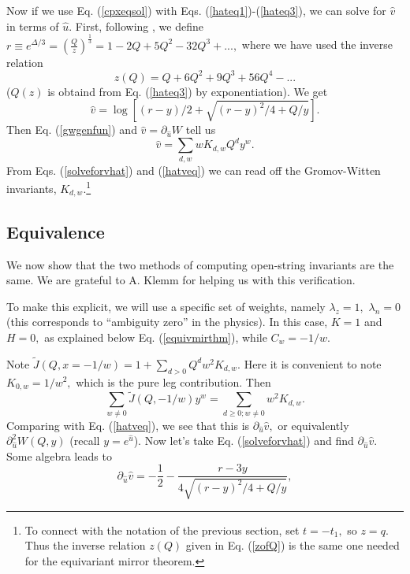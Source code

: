 \documentclass[a4paper,11pt]{article}
\begin{document}
Now if we use Eq. \!(\ref{cpxeqsol}) with
Eqs. (\ref{hateq1})-(\ref{hateq3}), we can
solve for $\hat{v}$ in terms of $\hat{u}.$
First, 
following \cite{AKV},
we define $r \equiv e^{\Delta/3} =
(\frac{Q}{z})^{\frac{1}{3}} = 1 - 2Q + 5Q^2 - 32Q^3 + ...,$
where we have used the inverse relation
\begin{equation}
\label{zofQ}
z(Q) = Q + 6Q^2 + 9Q^3 + 56Q^4 - ...
\end{equation}
($Q(z)$ is obtaind from Eq. \!(\ref{hateq3}) by exponentiation). 
We get
\begin{equation}
\label{solveforvhat}
\hat{v} = \log\left[(r-y)/2 + \sqrt{(r-y)^2/4 + Q/y}\right].
\end{equation}
Then Eq. \!(\ref{gwgenfun})
and $\hat{v} = \partial_{\hat{u}}W$
tell us
\begin{equation}
\label{hatveq}
\hat{v} = \sum_{d,w}w K_{d,w}Q^d y^w.
\end{equation}
From Eqs. (\ref{solveforvhat})
and (\ref{hatveq}) we can read off the Gromov-Witten
invariants, $K_{d,w}.$\footnote{To
connect with the notation of the previous section,
set $t = -t_1,$ so $z = q.$  Thus the inverse relation
$z(Q)$ given in Eq. \!(\ref{zofQ})
is the same one needed for the equivariant mirror theorem.}

\subsection{Equivalence}

We now show that the two methods of computing
open-string invariants are the same.  We are grateful
to A. Klemm for helping us with this verification.

To make this explicit, we will use a specific set
of weights, namely $\lambda_z = 1,$ $\lambda_n = 0$
(this corresponds to ``ambiguity zero'' in the physics).
In this case, 
$K = 1$ and $H = 0,$ as explained below
Eq. \!(\ref{equivmirthm}),
while $C_w = -1/w.$

Note
$\widetilde{J}(Q,x=-1/w) = 1 + \sum_{d>0} Q^d w^2 K_{d,w}.$
Here it is convenient to note $K_{0,w} = 1/w^2,$
which is the pure leg contribution.
Then
$$\sum_{w\neq 0} \widetilde{J}(Q,-1/w)y^w =
\sum_{d \geq 0; w \neq 0} w^2 K_{d,w}.$$
Comparing with Eq. \!(\ref{hatveq}), we see that this is
$\partial_{\hat{u}}{\hat{v}},$ or
equivalently $\partial^2_{\hat{u}} W(Q,y)$
(recall $y = e^{\hat{u}}$).
Now let's take Eq. \!(\ref{solveforvhat}) and
find $\partial_{\hat{u}} \hat{v}.$
Some algebra leads to 
$$\partial_{\hat{u}} \hat{v} =
-\frac{1}{2} - \frac{r-3y}{4\sqrt{(r-y)^2/4 + Q/y}},$$
\end{document}
